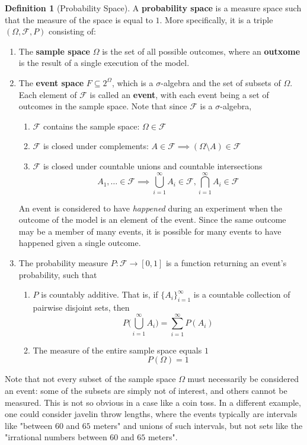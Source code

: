 \documentclass{article}
\theoremstyle{remark}
\theoremstyle{definition}
\newtheorem{definition}{Definition}[section]
\begin{document}
\begin{definition}[Probability Space]
A \textbf{probability space} is a measure space such that the measure of the space is equal to $1$. More specifically, it is a triple $(\Omega, \mathcal{F}, P)$ consisting of: 
\begin{enumerate}
    \item The \textbf{sample space} $\Omega$ is the set of all possible outcomes, where an \textbf{outxome} is the result of a single execution of the model. 
    \item The \textbf{event space} $F \subseteq 2^{\Omega}$, which is a $\sigma$-algebra and the set of subsets of $\Omega$. Each element of $\mathcal{F}$ is called an \textbf{event}, with each event being a set of outcomes in the sample space. Note that since $\mathcal{F}$ is a $\sigma$-algebra, 
    \begin{enumerate}
        \item $\mathcal{F}$ contains the sample space: $\Omega \in \mathcal{F}$
        \item $\mathcal{F}$ is closed under complements: $A \in \mathcal{F} \implies (\Omega \setminus A) \in \mathcal{F}$
        \item $\mathcal{F}$ is closed under countable unions and countable intersections
        \[A_1, \ldots \in \mathcal{F} \implies \bigcup_{i=1}^\infty A_i \in \mathcal{F}, \bigcap_{i=1}^\infty A_i \in \mathcal{F}\]
    \end{enumerate}
    An event is considered to have \textit{happened} during an experiment when the outcome of the model is an element of the event. Since the same outcome may be a member of many events, it is possible for many events to have happened given a single outcome. 
    \item The probability measure $P: \mathcal{F} \longrightarrow [0,1]$ is a function returning an event's probability, such that
    \begin{enumerate}
        \item $P$ is countably additive. That is, if $\{A_i\}_{i=1}^\infty$ is a countable collection of pairwise disjoint sets, then 
        \[P \bigg( \bigcup_{i=1}^\infty A_i \bigg) = \sum_{i=1}^\infty P(A_i)\]
        \item The measure of the entire sample space equals $1$
        \[P(\Omega) = 1\]
    \end{enumerate}
\end{enumerate}
Note that not every subset of the sample space $\Omega$ must necessarily be considered an event: some of the subsets are simply not of interest, and others cannot be measured. This is not so obvious in a case like a coin toss. In a different example, one could consider javelin throw lengths, where the events typically are intervals like "between $60$ and $65$ meters" and unions of such intervals, but not sets like the "irrational numbers between $60$ and $65$ meters".
\end{definition}
\end{document}
